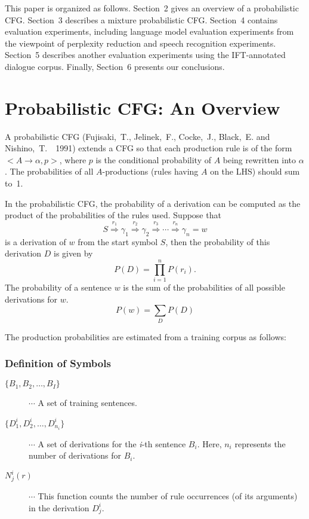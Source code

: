 This paper is organized as follows.
Section~2 gives an overview of a probabilistic CFG.
Section~3 describes a mixture probabilistic CFG.
Section~4 contains evaluation experiments,
including language model evaluation experiments
from the viewpoint of perplexity reduction
and speech recognition experiments.
Section~5 describes another evaluation experiments
using the IFT-annotated dialogue corpus.
Finally, Section~6 presents our conclusions.


\section{Probabilistic CFG: An Overview}

A probabilistic CFG (Fujisaki,~T., Jelinek,~F., Cocke,~J., Black,~E. and Nishino,~T.~~1991) extends
a CFG so that each production rule is of the form
$<\!\!A \rightarrow \alpha, p\!\!>$,
where $p$ is the conditional probability of $A$ being rewritten into $\alpha$.
The probabilities of all $A$-productions (rules having $A$ on the LHS)
should sum to~1.

In the probabilistic CFG, the probability of a derivation can be computed
as the product of the probabilities of the rules used.
Suppose that
\begin{equation}
  S \stackrel{r_{1}}{\Longrightarrow} \gamma_{1}
    \stackrel{r_{2}}{\Longrightarrow} \gamma_{2}
    \stackrel{r_{3}}{\Longrightarrow} \cdots
    \stackrel{r_{n}}{\Longrightarrow} \gamma_{n} = w
\end{equation}
is a derivation of $w$ from the start symbol $S$,
then the probability of this derivation $D$ is given by
\begin{equation}
  P(D) = \prod_{i=1}^{n} P(r_{i}).
\end{equation}
The probability of a sentence $w$ is the sum of the probabilities
of all possible derivations for $w$.
\begin{equation}
  P(w) = \sum_{D} P(D)
\end{equation}


The production probabilities are estimated
from a training corpus as follows:

\subsubsection*{Definition of Symbols}

\begin{description}
\item[\hspace*{0.5cm}\mbox{$\{B_{1},B_{2},\ldots,B_{I}\}$}] $\cdots$
	A set of training sentences.
\item[\hspace*{0.5cm}\mbox{$\{D_{1}^{i},D_{2}^{i},\ldots,D_{n_{i}}^{i}\}$}] $\cdots$
	A set of derivations for the {\em i}-th sentence $B_{i}$.
	Here, $n_{i}$ represents the number of derivations for $B_{i}$.
\item[\hspace*{0.5cm}\mbox{$N_{j}^{i}(r)$}] $\cdots$
	This function counts the number of rule occurrences (of its arguments)
	in the derivation $D_{j}^{i}$.
\end{description}


